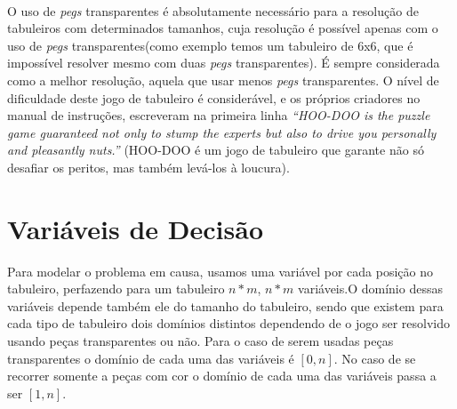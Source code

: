 \documentclass{llncs}
\begin{document}
\paragraph*{} 
O uso de \emph{pegs} transparentes \'{e} absolutamente necess\'{a}rio para a resolu\c{c}\~{a}o de tabuleiros com determinados tamanhos, cuja resolu\c{c}\~{a}o \'{e} poss\'{i}vel apenas com o uso de \emph{pegs} transparentes(como exemplo temos um tabuleiro de 6x6, que \'{e} imposs\'{i}vel resolver mesmo com duas \emph{pegs} transparentes). \'{E} sempre considerada como a melhor resolu\c{c}\~{a}o, aquela que usar menos \emph{pegs} transparentes. O nível de dificuldade deste jogo de tabuleiro é considerável, e os próprios criadores no manual de instruções, escreveram na primeira linha \textit{“HOO-DOO is the puzzle game guaranteed not only to stump the experts but also to drive you personally and pleasantly nuts.”} (HOO-DOO é um jogo de tabuleiro que garante não só desafiar os peritos, mas também levá-los à loucura).



\begin{figure}[h!]
\centering
{}
\quad\quad\quad
{}
\end{figure}

\section{Vari\'{a}veis de Decis\~{a}o}

Para modelar o problema em causa, usamos uma vari\'{a}vel por cada posi\c{c}\~{a}o no tabuleiro, perfazendo para um tabuleiro $n * m$, $n * m$ vari\'{a}veis.O dom\'{i}nio dessas vari\'{a}veis depende tamb\'{e}m ele do tamanho do tabuleiro, sendo que existem para cada tipo de tabuleiro dois dom\'{i}nios distintos dependendo de o jogo ser resolvido usando pe\c{c}as transparentes ou n\~{a}o.
Para o caso de serem usadas pe\c{c}as transparentes o dom\'{i}nio de cada uma das vari\'{a}veis \'{e} $[0,n]$.
No caso de se recorrer somente a pe\c{c}as com cor o dom\'{i}nio de cada uma das vari\'{a}veis passa a ser $[1,n]$.
\end{document}
